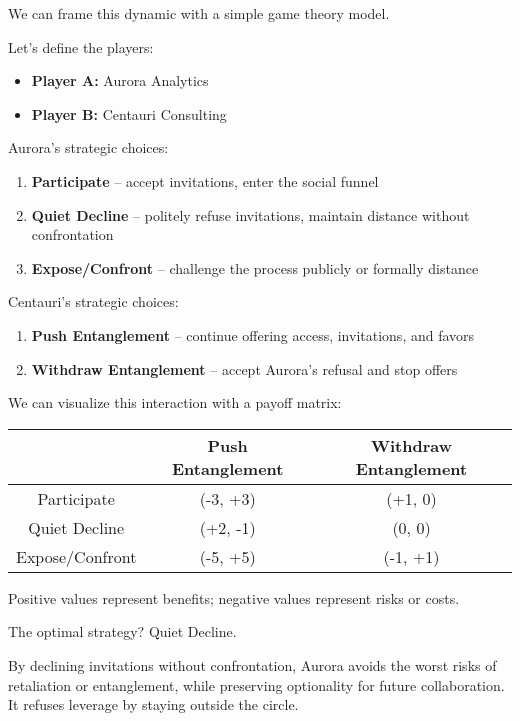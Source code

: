 \medskip

We can frame this dynamic with a simple game theory model.

Let’s define the players:

\begin{itemize}
  \item \textbf{Player A:} Aurora Analytics
  \item \textbf{Player B:} Centauri Consulting
\end{itemize}

Aurora’s strategic choices:

\begin{enumerate}
  \item \textbf{Participate} – accept invitations, enter the social funnel
  \item \textbf{Quiet Decline} – politely refuse invitations, maintain distance without confrontation
  \item \textbf{Expose/Confront} – challenge the process publicly or formally distance
\end{enumerate}

Centauri’s strategic choices:

\begin{enumerate}
  \item \textbf{Push Entanglement} – continue offering access, invitations, and favors
  \item \textbf{Withdraw Entanglement} – accept Aurora’s refusal and stop offers
\end{enumerate}

We can visualize this interaction with a payoff matrix:

\begin{center}
\begin{tabular}{|c|c|c|}
\hline
 & Push Entanglement & Withdraw Entanglement \\
\hline
Participate & (-3, +3) & (+1, 0) \\
\hline
Quiet Decline & (+2, -1) & (0, 0) \\
\hline
Expose/Confront & (-5, +5) & (-1, +1) \\
\hline
\end{tabular}
\end{center}

Positive values represent benefits; negative values represent risks or costs.

The optimal strategy? Quiet Decline.

By declining invitations without confrontation, Aurora avoids the worst risks of retaliation or entanglement, while preserving optionality for future collaboration. It refuses leverage by staying outside the circle.

